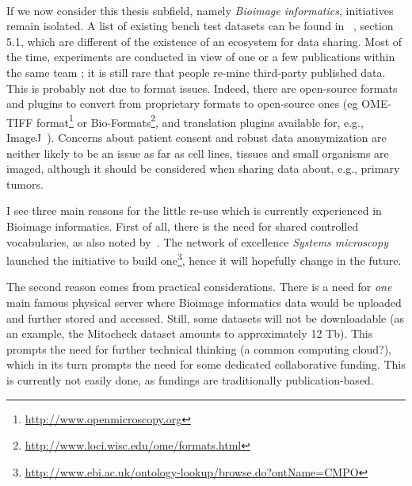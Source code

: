 \paragraph*{}
If we now consider this thesis subfield, namely \textit{Bioimage informatics}, initiatives remain isolated. A list of existing bench test datasets can be found in ~\cite{pmid18603566}, section 5.1, which are different of the existence of an ecosystem for data sharing. %
Most of the time, experiments are conducted in view of one or a few publications within the same team ; it is still rare that people re-mine third-party published data. This is probably not due to format issues. Indeed, there are open-source formats and plugins to convert from proprietary formats to open-source ones (eg OME-TIFF format\footnote{\href{http://www.openmicroscopy.org}{http://www.openmicroscopy.org}} or Bio-Formats\footnote{\href{http://www.loci.wisc.edu/ome/formats.html}{http://www.loci.wisc.edu/ome/formats.html}}, and translation plugins available for, e.g., ImageJ~\cite{imagej}). Concerns about patient consent and robust data anonymization are neither likely to be an issue as far as cell lines, tissues and small organisms are imaged, although it should be considered when sharing data about, e.g., primary tumors.

I see three main reasons for the little re-use which is currently experienced in Bioimage informatics. First of all, there is the need for shared controlled vocabularies, as also noted by~\cite{pmid18603566}. The network of excellence \textit{Systems microscopy} launched the initiative to build one\footnote{\href{http://www.ebi.ac.uk/ontology-lookup/browse.do?ontName=CMPO}{http://www.ebi.ac.uk/ontology-lookup/browse.do?ontName=CMPO}}, hence it will hopefully change in the future.

The second reason comes from practical considerations. There is a need for \textit{one} main famous physical server where Bioimage informatics data would be uploaded and further stored and accessed. Still, some datasets will not be downloadable (as an example, the Mitocheck dataset amounts to approximately 12 Tb). This prompts the need for further technical thinking (a common computing cloud?), which in its turn prompts the need for some dedicated collaborative funding. This is currently not easily done, as fundings are traditionally publication-based.%

